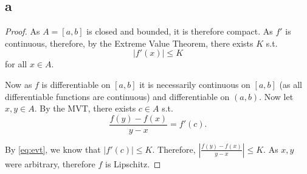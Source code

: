 \documentclass[10pt]{article}
\newtheorem{lemma}[]{Lemma}
\begin{document}
\subsection*{a} 

\begin{proof}
    As $A=[a,b]$ is closed and bounded, it is therefore compact. As $f'$ is continuous, therefore, by the Extreme Value Theorem, there exists $K$ s.t. 
    \begin{equation} \label{eq:evt}
        |f'(x)|\le K
    \end{equation}
    for all $x \in A.$

    Now as $f$ is differentiable on $[a,b]$ it is necessarily continuous on $[a,b]$ (as all differentiable functions are continuous) and differentiable on $(a,b).$ Now let $x,y\in A.$ By the MVT, there exists $c\in A$ s.t.
    \begin{equation*}
        \frac{f(y)-f(x)}{y-x}=f'(c).
    \end{equation*}

    By \eqref{eq:evt}, we know that $|f'(c)|\le K.$ Therefore, $|\frac{f(y)-f(x)}{y-x}|\le K.$ As $x,y$ were arbitrary, therefore $f$ is Lipschitz.
\end{proof}


\end{document}
